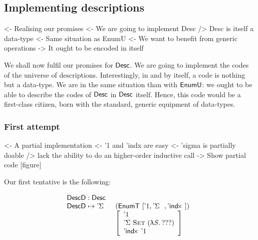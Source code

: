 \subsection{Implementing descriptions}

\begin{wstructure}
<- Realising our promises
    <- We are going to implement Desc
    /> Desc is itself a data-type
        <- Same situation as EnumU
            <- We want to benefit from generic operations
        -> It ought to be encoded in itself
\end{wstructure}

We shall now fulfil our promises for $\Desc$. We are going to
implement the codes of the universe of descriptions. Interestingly, in
and by itself, a code is nothing but a data-type. We are in the same
situation than with $\EnumU$: we ought to be able to describe the
codes of $\Desc$ in $\Desc$ itself. Hence, this code would be a
first-class citizen, born with the standard, generic equipment of
data-types.

\subsubsection{First attempt}

\begin{wstructure}
<- A partial implementation
    <- '1 and 'indx are easy
    <- 'sigma is partially doable
        /> lack the ability to do an higher-order inductive call
    -> Show partial code [figure]
\end{wstructure}

Our first tentative is the following:

\[\stk{
\DescD : \Desc \\
\begin{array}{@{}ll}
\DescD \mapsto \DSigma{}{} & (\EnumT [ \DUnit, \DSigma{}{}, \DIndx{} ])  \\
                           & \left[\begin{array}{l}
                                   \DUnit                                \\
                                   \DSigma{\Set}{(\LAM{\V{S}} ???)}      \\
                                   \DIndx{\DUnit}                        \\
                                   \end{array}
                             \right]
\end{array}
}\]

